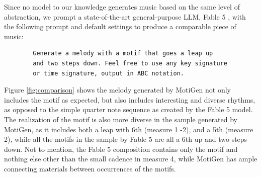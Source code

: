 \documentclass{article}
\newcommand{\planned}[1]{\textcolor{gray!70}{\textit{[Planned: #1]}}}
\newcommand{\resph}[1]{\textcolor{gray}{\texttt{[#1]}}}
\newcommand{\motif}[1]{\texttt{(#1)}}
\newcommand{\method}{MotiGen}
\begin{document}
Since no model to our knowledge generates music based on the same level of abstraction, we prompt a state-of-the-art general-purpose LLM, Fable 5 \citep{anthropic2026fable5}, with the following prompt and default settings to produce a comparable piece of music: 
\begin{verbatim}
        Generate a melody with a motif that goes a leap up
        and two steps down. Feel free to use any key signature
        or time signature, output in ABC notation.
\end{verbatim}
Figure \ref{fig:comparison} shows the melody generated by \method{} not only includes the motif as expected, but also includes interesting and diverse rhythms, as opposed to the simple quarter note sequence as created by the Fable 5 model. The realization of the motif is also more diverse in the sample generated by \method{}, as it includes both a leap with 6th (measure 1 -2), and a 5th (measure 2), while all the motifs in the sample by Fable 5 are all a 6th up and two steps down. Not to mention, the Fable 5 composition contains only the motif and nothing else other than the small cadence in measure 4, while \method{} has ample connecting materials between occurrences of the motifs.




\end{document}
